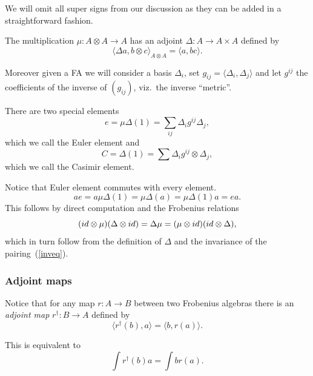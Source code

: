 \documentclass[11pt]{article}
\begin{document}
We will omit all super signs from our discussion as they can be added in a straightforward fashion.

The multiplication $\mu:A\otimes A\to A$ has an adjoint $\Delta: A\to A\times A$
def\/ined by
\begin{equation}
\label{inveq} \langle \Delta a, b\otimes c\rangle_{A\otimes
A}=\langle a,bc\rangle.
\end{equation}

Moreover given a FA we will consider a basis $\Delta_i$, set $g_{ij}=\langle \Delta_i,\Delta_j\rangle$
and let $g^{ij}$ the coef\/f\/icients of the inverse of $(g_{ij})$, viz.\ the inverse ``metric''.

There are two special elements
\begin{equation*}
e=\mu\Delta(1)=\sum_{ij} \Delta_i g^{ij}\Delta_j,
\end{equation*}
which we call the Euler element and
\begin{equation*}
C=\Delta(1)=\sum \Delta_i g^{ij} \otimes \Delta_j,
\end{equation*}
which we call the Casimir element.

Notice that Euler element commutes with every element.
\begin{equation*}
ae=a\mu\Delta(1)=\mu\Delta(a)=\mu\Delta(1)a=ea.
\end{equation*}
This follows by direct computation and the Frobenius relations
\begin{equation*}
({\rm id}\otimes \mu)(\Delta\otimes {\rm id})=\Delta\mu=(\mu\otimes
{\rm id})({\rm id}\otimes \Delta),
\end{equation*}
which in turn follow from the def\/inition of $\Delta$ and the
invariance of the pairing~(\ref{inveq}).

\subsubsection{Adjoint maps}
Notice that for any map $r:A\to B$ between two Frobenius algebras
there is an {\em adjoint map} $r^{\dagger}:B\to A$ def\/ined by
\begin{equation*}
 \langle r^{\dagger}(b) ,a  \rangle =\langle b,r(a)\rangle.
\end{equation*}

This is equivalent to
\begin{equation}
\label{adjointeq}
 \int r^{\dagger}(b)a  =\int br(a).
\end{equation}
\end{document}
